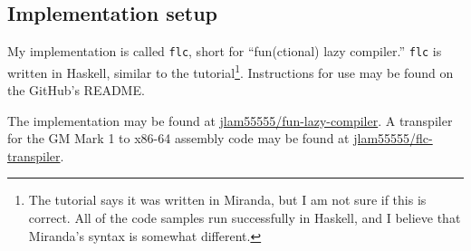 \subsection{Implementation setup}
\label{sec:implementation-setup}

My implementation is called \texttt{flc}, short for ``fun(ctional) lazy compiler.'' \texttt{flc} is written in Haskell, similar to the tutorial\footnote{The tutorial says it was written in Miranda, but I am not sure if this is correct. All of the code samples run successfully in Haskell, and I believe that Miranda's syntax is somewhat different.}. Instructions for use may be found on the GitHub's README.

The implementation may be found at \href{https://github.com/jlam55555/fun-lazy-compiler}{jlam55555/fun-lazy-compiler}. A transpiler for the GM Mark 1 to x86-64 assembly code may be found at \href{https://github.com/jlam55555/flc-transpiler}{jlam55555/flc-transpiler}.

